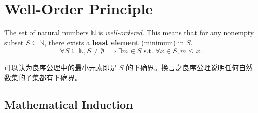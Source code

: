 \documentclass[
	UTF-8,
	11pt, %
	a4paper, %
]{LegrandOrangeBook}
\begin{document}
\begin{proposition}
\begin{enumerate}
\begin{center}
        \end{center}

    \end{enumerate}
    \end{proposition}

    \newpage
    
    \section{Well-Order Principle}

    \begin{definition}
    The set of natural numbers $\mathbb{N}$ is \textit{well-ordered}. This means that for any nonempty subset $S \subseteq \mathbb{N}$, there exists a \textbf{least element} (minimum) in $S$.
    \[ \forall S \subseteq \mathbb{N}, S \neq \emptyset \implies \exists m \in S \text{ s.t. } \forall x \in S, m \le x. \]
    \end{definition}

    \begin{remark}
        可以认为良序公理中的最小元素即是 $S$ 的下确界。换言之良序公理说明任何自然数集的子集都有下确界。
    \end{remark}

    \subsection{Mathematical Induction}
\end{document}

